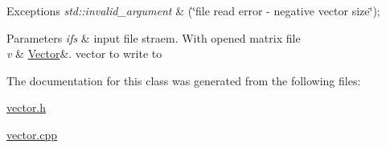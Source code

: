\begin{DoxyExceptions}{Exceptions}
{\em std\+::invalid\+\_\+argument} & (\char`\"{}file read error -\/ negative vector size\char`\"{}); \\
\hline
\end{DoxyExceptions}

\begin{DoxyParams}{Parameters}
{\em ifs} & input file straem. With opened matrix file \\
\hline
{\em v} & \mbox{\hyperlink{class_vector}{Vector}}\&. vector to write to \\
\hline
\end{DoxyParams}


The documentation for this class was generated from the following files\+:\begin{DoxyCompactItemize}
\item 
\mbox{\hyperlink{vector_8h}{vector.\+h}}\item 
\mbox{\hyperlink{vector_8cpp}{vector.\+cpp}}\end{DoxyCompactItemize}
